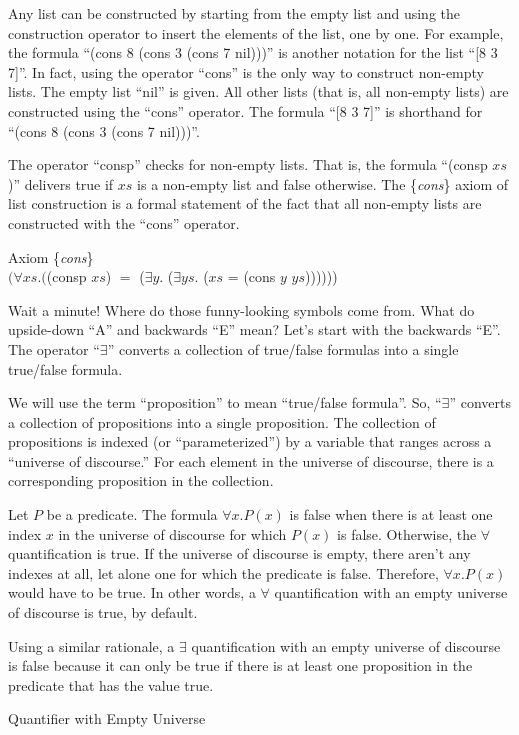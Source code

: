 Any list can be constructed by starting from the empty list
and using the construction operator to insert the elements of the list, one by one.
For example, the formula ``(cons 8 (cons 3 (cons 7 nil)))''
is another notation for the list ``[8 3 7]''.
In fact, using the operator ``cons'' is the only way to construct non-empty lists.
The empty list ``nil'' is given.
All other lists (that is, all non-empty lists) are constructed using the ``cons'' operator.
The formula ``[8 3 7]'' is shorthand for ``(cons 8 (cons 3 (cons 7 nil)))''.

The operator ``consp'' checks for non-empty lists.
That is, the formula ``(consp $xs$)'' delivers true
if $xs$ is a non-empty list and false otherwise.
The \{\emph{cons}\} axiom of list construction is a
formal statement of the fact that all non-empty lists
are constructed with the ``cons'' operator.
\begin{samepage}
\label{cons-axiom-formal}
\begin{center}
Axiom \{\emph{cons}\} \\
$(\forall xs.($(consp $xs$) $=$ ($\exists y.$ ($\exists ys.$ ($xs$ = (cons $y$ $ys$))))))
\end{center}
\end{samepage}

Wait a minute! Where do those funny-looking symbols come from.
What do upside-down ``A'' and backwards ``E'' mean?
Let's start with the backwards ``E''.
The operator
\label{exists-def}
``$\exists$'' converts a collection of true/false formulas
into a single true/false formula.

\label{proposition-def}
We will use the term ``proposition'' to mean ``true/false formula''.
So, ``$\exists$'' converts a collection of propositions
into a single proposition.
The collection of propositions is indexed (or ``parameterized'')
by a variable that ranges across a
\label{universe-def}
``universe of discourse.''
For each element in the universe of discourse,
there is a corresponding proposition in the collection.

\begin{aside}
Let $P$ be a predicate.
The formula $\forall x.P(x)$ is false when there is
at least one index $x$ in the universe of discourse
for which $P(x)$ is false.
Otherwise, the $\forall$ quantification is true.
If the universe of discourse is empty,
there aren't any indexes at all,
let alone one for which the predicate is false.
Therefore, $\forall x.P(x)$ would have to be true.
In other words, a $\forall$ quantification with an
empty universe of discourse is true, by default.

Using a similar rationale, a $\exists$ quantification
with an empty universe of discourse is false
because it can only be true if there is
at least one proposition in the predicate
that has the value true.
\caption{Quantifier with Empty Universe}
\label{empty-forall}
\end{aside}

